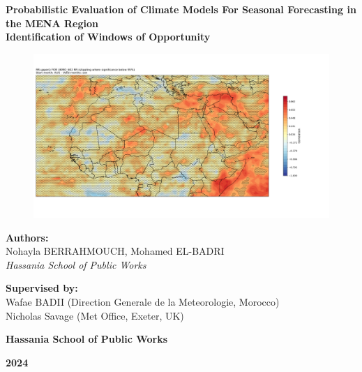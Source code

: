\begin{titlepage}
    \centering



%



    \Huge
   \textbf{Probabilistic Evaluation of Climate Models For Seasonal Forecasting in the MENA Region} \\

    \vspace{0.5cm}
    \Large
    \textbf{Identification of Windows of Opportunity}

    \vspace{0.5cm}
    
    \begin{figure}[H]
    \centering
    \includegraphics[scale=0.3]{titlepage.png} 
    \end{figure}

    \Large
    \textbf{Authors:} \\
    Nohayla BERRAHMOUCH, Mohamed EL-BADRI \\
    \textit{Hassania School of Public Works}

    \vspace{0.5cm}
    \textbf{Supervised by:} \\
    Wafae BADII (Direction Generale de la Meteorologie, Morocco)\\ Nicholas Savage (Met Office, Exeter, UK)

    \Large
    \textbf{Hassania School of Public Works}

    \vspace{0.8cm}

    \Large
    \textbf{2024}

    \vspace{0.31cm}

    
\end{titlepage}
